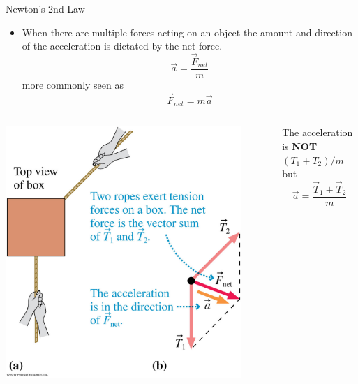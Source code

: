 \documentclass{beamer}
\begin{document}
\begin{frame}{Newton's 2nd Law}
\begin{itemize}
   \item When there are multiple forces acting on an object the amount and direction of the acceleration is dictated by the net force.
   \begin{equation*}
      \vec{a} = \frac{\vec{F}_{net}}{m}
   \end{equation*}
   more commonly seen as
   \begin{equation*}
      \vec{F}_{net} = m\vec{a}
   \end{equation*}
\end{itemize}
\begin{columns}
\begin{column}{0.5\textwidth}
\begin{center}
   \includegraphics[width=0.90\textwidth]{../figures/05_17_Figure.jpg}
\end{center}
\end{column}
\begin{column}{0.5\textwidth}
The acceleration is {\bf NOT} $(T_1+T_2)/m$ but
\begin{equation*}
   \vec{a} = \frac{\vec{T}_1+\vec{T}_2}{m}
\end{equation*}
\end{column}
\end{columns}
\end{frame}
\end{document}

